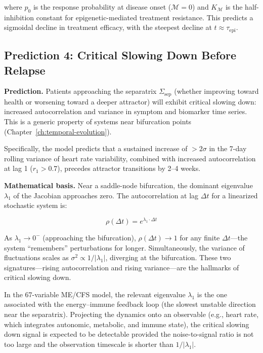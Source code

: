 where $p_0$ is the response probability at disease onset ($\mathcal{M} = 0$) and $K_{\mathcal{M}}$ is the half-inhibition constant for epigenetic-mediated treatment resistance. This predicts a sigmoidal decline in treatment efficacy, with the steepest decline at $t \approx \tau_{\text{epi}}$.

\subsection{Prediction 4: Critical Slowing Down Before Relapse}
\label{sec:prediction-csd}

\textbf{Prediction.} Patients approaching the separatrix $\Sigma_{\mathrm{sep}}$ (whether improving toward health or worsening toward a deeper attractor) will exhibit critical slowing down: increased autocorrelation and variance in symptom and biomarker time series. This is a generic property of systems near bifurcation points (Chapter~\ref{ch:temporal-evolution}).

Specifically, the model predicts that a sustained increase of $> 2\sigma$ in the 7-day rolling variance of heart rate variability, combined with increased autocorrelation at lag 1 ($r_1 > 0.7$), precedes attractor transitions by 2--4 weeks.

\textbf{Mathematical basis.} Near a saddle-node bifurcation, the dominant eigenvalue $\lambda_1$ of the Jacobian approaches zero. The autocorrelation at lag $\Delta t$ for a linearized stochastic system is:

\begin{equation}
\label{eq:csd-autocorrelation}
\rho(\Delta t) = e^{\lambda_1 \cdot \Delta t}
\end{equation}

As $\lambda_1 \to 0^-$ (approaching the bifurcation), $\rho(\Delta t) \to 1$ for any finite $\Delta t$---the system ``remembers'' perturbations for longer. Simultaneously, the variance of fluctuations scales as $\sigma^2 \propto 1/|\lambda_1|$, diverging at the bifurcation. These two signatures---rising autocorrelation and rising variance---are the hallmarks of critical slowing down.

In the 67-variable ME/CFS model, the relevant eigenvalue $\lambda_1$ is the one associated with the energy--immune feedback loop (the slowest unstable direction near the separatrix). Projecting the dynamics onto an observable (e.g., heart rate, which integrates autonomic, metabolic, and immune state), the critical slowing down signal is expected to be detectable provided the noise-to-signal ratio is not too large and the observation timescale is shorter than $1/|\lambda_1|$.

